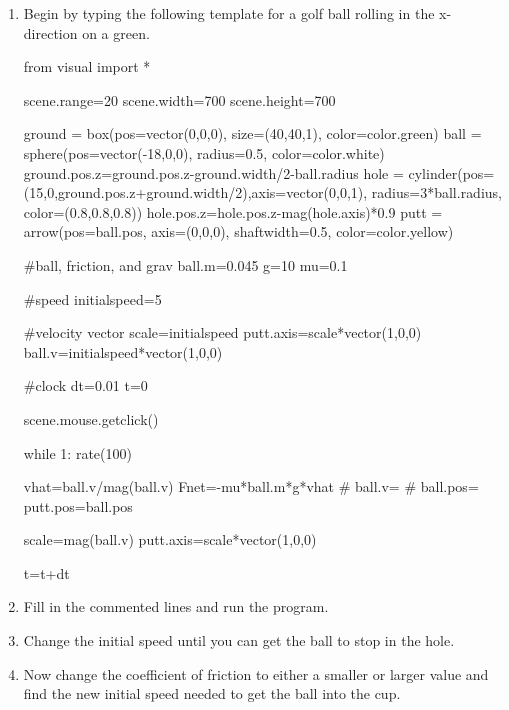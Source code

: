 \begin{enumerate}

\item Begin by typing the following template for a golf ball rolling in the x-direction on a green.

\begin{vpythonblock}
from visual import *

scene.range=20
scene.width=700
scene.height=700

ground = box(pos=vector(0,0,0), size=(40,40,1), color=color.green)
ball = sphere(pos=vector(-18,0,0), radius=0.5, color=color.white)
ground.pos.z=ground.pos.z-ground.width/2-ball.radius
hole = cylinder(pos=(15,0,ground.pos.z+ground.width/2),axis=vector(0,0,1), radius=3*ball.radius, color=(0.8,0.8,0.8))
hole.pos.z=hole.pos.z-mag(hole.axis)*0.9
putt = arrow(pos=ball.pos, axis=(0,0,0), shaftwidth=0.5, color=color.yellow)

#ball, friction, and grav
ball.m=0.045
g=10
mu=0.1

#speed
initialspeed=5

#velocity vector
scale=initialspeed
putt.axis=scale*vector(1,0,0)
ball.v=initialspeed*vector(1,0,0)


#clock
dt=0.01
t=0

scene.mouse.getclick()

while 1:
        rate(100)

        vhat=ball.v/mag(ball.v)
        Fnet=-mu*ball.m*g*vhat
#        ball.v=
#        ball.pos=
        putt.pos=ball.pos

        scale=mag(ball.v)
        putt.axis=scale*vector(1,0,0)

        t=t+dt

\end{vpythonblock}

\item Fill in the commented lines and run the program.

\item Change the initial speed until you can get the ball to stop in the hole.

\item Now change the coefficient of friction to either a smaller or larger value and find the new initial speed needed to get the ball into the cup.

\end{enumerate}



